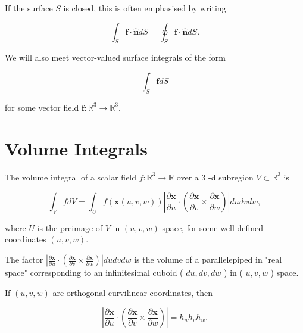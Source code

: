 \begin{definition}
  If the surface \(S\) is closed, this is often emphasised by writing

\[
\int_S \boldsymbol{f} \cdot \hat{\boldsymbol{n}} d S=\oint_S \boldsymbol{f} \cdot \hat{\boldsymbol{n}} d S .
\]
\end{definition}

\begin{definition}
  We will also meet vector-valued surface integrals of the form

\[
\int_S \boldsymbol{f} d S
\]

for some vector field \(\boldsymbol{f}: \mathbb{R}^3 \rightarrow \mathbb{R}^3\).
\end{definition}

\section{Volume Integrals}

\begin{definition}
  The volume integral of a scalar field \(f: \mathbb{R}^3 \rightarrow \mathbb{R}\) over a 3 -d subregion \(V \subset \mathbb{R}^3\) is

\[
\int_V f d V=\int_U f(\boldsymbol{x}(u, v, w))\left|\frac{\partial \boldsymbol{x}}{\partial u} \cdot\left(\frac{\partial \boldsymbol{x}}{\partial v} \times \frac{\partial \boldsymbol{x}}{\partial w}\right)\right| d u d v d w,
\]

where \(U\) is the preimage of \(V\) in \((u, v, w)\) space, for some well-defined coordinates \((u, v, w)\).
\end{definition}

\begin{remark}
  The factor \(\left|\frac{\partial \boldsymbol{x}}{\partial u} \cdot\left(\frac{\partial \boldsymbol{x}}{\partial v} \times \frac{\partial \boldsymbol{x}}{\partial w}\right)\right| d u d v d w\) is the volume of a parallelepiped in "real space" corresponding to an infinitesimal cuboid ( \(d u, d v, d w\) ) in ( \(u, v, w\) ) space.
\end{remark}

\begin{proposition}
  If \((u, v, w)\) are orthogonal curvilinear coordinates, then

\[
\left|\frac{\partial \boldsymbol{x}}{\partial u} \cdot\left(\frac{\partial \boldsymbol{x}}{\partial v} \times \frac{\partial \boldsymbol{x}}{\partial w}\right)\right|=h_u h_v h_w .
\]
\end{proposition}

